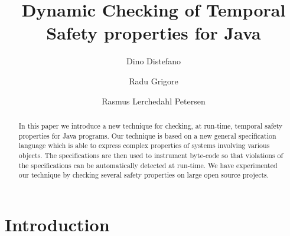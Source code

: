 \documentclass[10pt]{llncs} %
\title{Dynamic Checking of Temporal Safety properties for Java}
\author{Dino Distefano \and Radu Grigore \and Rasmus Lerchedahl Petersen}
\institute{Queen Mary University of London }
\begin{document}
\maketitle

\begin{abstract} %
In this paper we introduce a new technique for checking, at run-time, temporal safety properties for Java programs.
Our technique is based on a new general specification language which is able to express complex properties of 
systems involving various objects. The specifications are then used to instrument byte-code  so that violations of the specifications can be automatically detected at run-time. 
We have experimented our technique by checking several safety properties on large open source projects.
\end{abstract}


\section{Introduction} %
\end{document}
